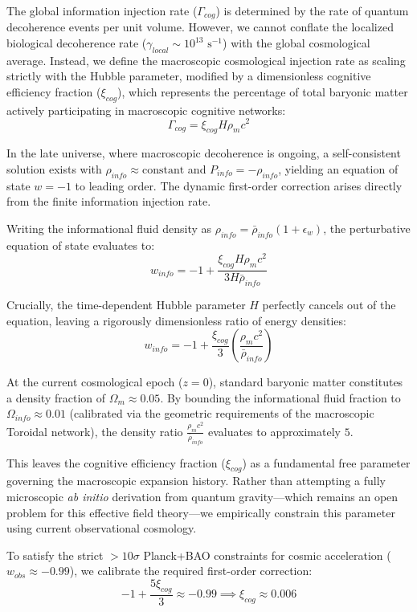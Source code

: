 \documentclass[12pt,openany]{book}
\theoremstyle{plain}
\theoremstyle{definition}
\theoremstyle{remark}
\begin{document}
The global information injection rate ($\Gamma_{cog}$) is determined by the rate of quantum decoherence events per unit volume. However, we cannot conflate the localized biological decoherence rate ($\gamma_{local} \sim 10^{13}\text{ s}^{-1}$) with the global cosmological average. Instead, we define the macroscopic cosmological injection rate as scaling strictly with the Hubble parameter, modified by a dimensionless cognitive efficiency fraction ($\xi_{cog}$), which represents the percentage of total baryonic matter actively participating in macroscopic cognitive networks:$$\Gamma_{cog} = \xi_{cog} H \rho_m c^2$$

In the late universe, where macroscopic decoherence is ongoing, a self-consistent solution exists with $\rho_{info} \approx \text{constant}$ and $P_{info} = -\rho_{info}$, yielding an equation of state $w = -1$ to leading order. The dynamic first-order correction arises directly from the finite information injection rate.

Writing the informational fluid density as $\rho_{info} = \bar{\rho}_{info}(1 + \epsilon_w)$, the perturbative equation of state evaluates to:$$w_{info} = -1 + \frac{\xi_{cog} H \rho_m c^2}{3H \bar{\rho}_{info}}$$

Crucially, the time-dependent Hubble parameter $H$ perfectly cancels out of the equation, leaving a rigorously dimensionless ratio of energy densities:$$w_{info} = -1 + \frac{\xi_{cog}}{3} \left( \frac{\rho_m c^2}{\bar{\rho}_{info}} \right)$$

At the current cosmological epoch ($z = 0$), standard baryonic matter constitutes a density fraction of $\Omega_m \approx 0.05$. By bounding the informational fluid fraction to $\Omega_{info} \approx 0.01$ (calibrated via the geometric requirements of the macroscopic Toroidal network), the density ratio $\frac{\rho_m c^2}{\bar{\rho}_{info}}$ evaluates to approximately $5$.

This leaves the cognitive efficiency fraction ($\xi_{cog}$) as a fundamental free parameter governing the macroscopic expansion history. Rather than attempting a fully microscopic \textit{ab initio} derivation from quantum gravity—which remains an open problem for this effective field theory—we empirically constrain this parameter using current observational cosmology. 

To satisfy the strict $> 10\sigma$ Planck+BAO constraints for cosmic acceleration ($w_{obs} \approx -0.99$), we calibrate the required first-order correction:
$$ -1 + \frac{5\xi_{cog}}{3} \approx -0.99 \implies \xi_{cog} \approx 0.006 $$
\end{document}
